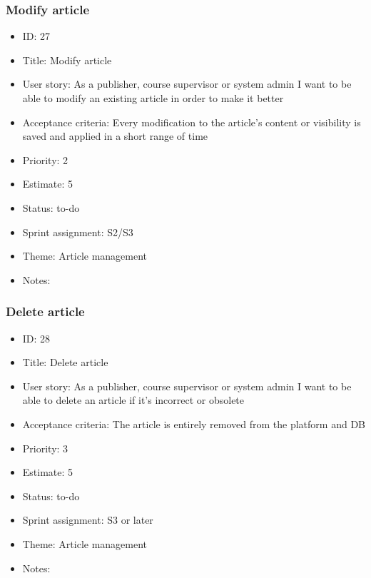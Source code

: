 \subsubsection{Modify article}
\begin{itemize}
	\item ID: 27 
	\item Title: Modify article
	\item User story: As a publisher, course supervisor or system admin I want to be able to modify an existing article in order to make it better
	\item Acceptance criteria: Every modification to the article's content or visibility is saved and applied in a short range of time
	\item Priority: 2
	\item Estimate: 5
	\item Status: to-do
	\item Sprint assignment: S2/S3
	\item Theme: Article management
	\item Notes:
\end{itemize}

\subsubsection{Delete article}
\begin{itemize}
	\item ID: 28
	\item Title: Delete article
	\item User story: As a publisher, course supervisor or system admin I want to be able to delete an article if it's incorrect or obsolete
	\item Acceptance criteria: The article is entirely removed from the platform and DB
	\item Priority: 3
	\item Estimate: 5
	\item Status: to-do
	\item Sprint assignment: S3 or later
	\item Theme: Article management
	\item Notes:
\end{itemize}

